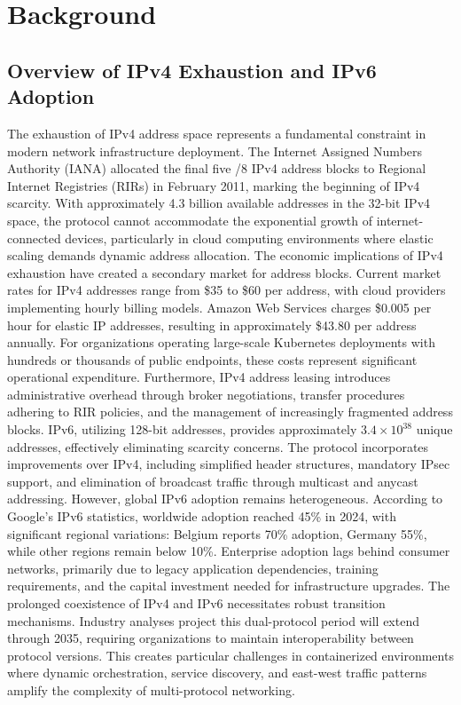 \chapter{Background}


\section{Overview of IPv4 Exhaustion and IPv6 Adoption}

The exhaustion of IPv4 address space represents a fundamental constraint in modern network infrastructure deployment. The Internet Assigned Numbers Authority (IANA) allocated the final five /8 IPv4 address blocks to Regional Internet Registries (RIRs) in February 2011, marking the beginning of IPv4 scarcity. With approximately 4.3 billion available addresses in the 32-bit IPv4 space, the protocol cannot accommodate the exponential growth of internet-connected devices, particularly in cloud computing environments where elastic scaling demands dynamic address allocation.
The economic implications of IPv4 exhaustion have created a secondary market for address blocks. Current market rates for IPv4 addresses range from \$35 to \$60 per address, with cloud providers implementing hourly billing models. Amazon Web Services charges \$0.005 per hour for elastic IP addresses, resulting in approximately \$43.80 per address annually. For organizations operating large-scale Kubernetes deployments with hundreds or thousands of public endpoints, these costs represent significant operational expenditure. Furthermore, IPv4 address leasing introduces administrative overhead through broker negotiations, transfer procedures adhering to RIR policies, and the management of increasingly fragmented address blocks.
IPv6, utilizing 128-bit addresses, provides approximately $3.4 \times 10^{38}$ unique addresses, effectively eliminating scarcity concerns. The protocol incorporates improvements over IPv4, including simplified header structures, mandatory IPsec support, and elimination of broadcast traffic through multicast and anycast addressing. However, global IPv6 adoption remains heterogeneous. According to Google's IPv6 statistics, worldwide adoption reached 45\% in 2024, with significant regional variations: Belgium reports 70\% adoption, Germany 55\%, while other regions remain below 10\%. Enterprise adoption lags behind consumer networks, primarily due to legacy application dependencies, training requirements, and the capital investment needed for infrastructure upgrades.
The prolonged coexistence of IPv4 and IPv6 necessitates robust transition mechanisms. Industry analyses project this dual-protocol period will extend through 2035, requiring organizations to maintain interoperability between protocol versions. This creates particular challenges in containerized environments where dynamic orchestration, service discovery, and east-west traffic patterns amplify the complexity of multi-protocol networking.

